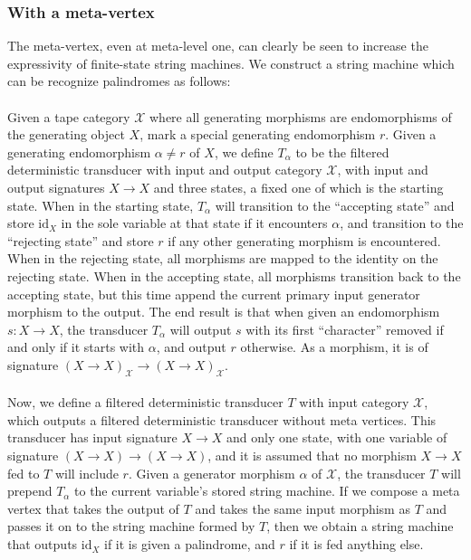 \documentclass{article}
\theoremstyle{definition}
\theoremstyle{remark}
\begin{document}
\subsubsection{With a meta-vertex}
The meta-vertex, even at meta-level one, can clearly be seen to
increase the expressivity of finite-state string machines. We
construct a string machine which can be recognize
palindromes as follows:
\\ \\
Given
a tape category $\mathcal{X}$ where all generating morphisms are
endomorphisms of the generating object $X$, mark 
a special generating endomorphism $r$. Given a generating
endomorphism $\alpha\neq r$
of $X$, we define $T_{\alpha}$ to be the
filtered deterministic transducer with input and output category
$\mathcal{X}$, with input and output signatures $X\to X$ and three
states, a fixed one of which is the starting state.
When in the starting state, $T_{\alpha}$ will transition to the
``accepting state'' and store $\mathrm{id}_X$ in the sole variable
at that state if it encounters $\alpha$, and transition to the
``rejecting state'' and store $r$ if any other
generating morphism is encountered. When in the rejecting state, all
morphisms are mapped to the identity on the rejecting state. When
in the accepting state, all morphisms transition back to the accepting
state, but this time append the current primary input generator
morphism to the output. The end result is that when
given an endomorphism $s:X\to X$, the transducer $T_{\alpha}$ will
output $s$ with its first ``character'' removed if and
only if it starts with $\alpha$, and output $r$ otherwise.
As a morphism, 
it is of signature $(X\to X)_{\mathcal{X}} \to (X\to X)_{\mathcal{X}}$.
\\ \\
Now, we define a
filtered
deterministic transducer $T$ with input category $\mathcal{X}$, which
outputs a filtered deterministic transducer without meta vertices.
This transducer has input signature $X\to X$ and only one state,
with one variable of signature $(X\to X) \to (X \to X)$, and
it is assumed that no morphism $X\to X$ fed to $T$ will include
$r$. Given a generator morphism $\alpha$ of $\mathcal{X}$,
the transducer
$T$ will prepend $T_{\alpha}$ to the current variable's stored string
machine. If we compose a meta vertex that takes the output of $T$
and takes the same input morphism as $T$ and passes it on to the
string machine formed by $T$, then we obtain a string machine that
outputs $\mathrm{id}_X$ if it is given a palindrome, and
$r$ if it is fed anything else.
\end{document}
